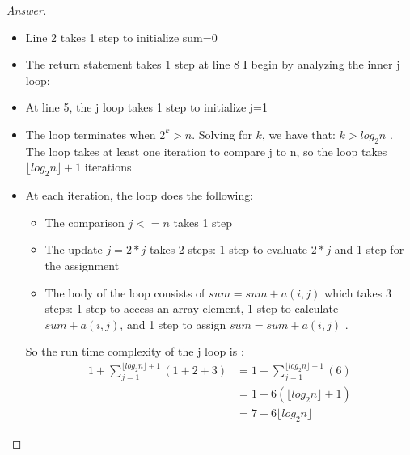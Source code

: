 \documentclass[11pt]{article}
\theoremstyle{definition}
\theoremstyle{definition}
\theoremstyle{definition}
\begin{document}
\begin{proof}[Answer]
\begin{itemize}
\item Line 2 takes 1 step to initialize sum=0
\item The return statement takes 1 step at line 8
I begin by analyzing the inner j loop:
\end{itemize}
\begin{itemize}
\item At line 5, the j loop takes 1 step to initialize j=1
\item The loop terminates when $2^k > n$. Solving for $k$, we have that: $k > log_2 n$ . The loop takes at least one iteration to compare j to n, so the loop takes $\lfloor{ log_2 n }\rfloor +1$ iterations 
\item At each iteration, the loop does the following:
	\begin{itemize}
	\item The comparison $j<=n$ takes 1 step
	\item The update $j=2*j$ takes 2 steps:  1 step to evaluate $2*j$ and 1 step for the assignment 
	\item The body of the loop consists of $sum = sum + a(i, j)$ which takes 3 steps: 1 step to access an array element, 1 step to calculate $sum+ a(i, j)$, and 1 step to assign $sum = sum + a(i, j)$ .
	\end{itemize}
So the run time complexity of the j loop is :
\begin{align*} 
1+ \sum_{j=1}^{\lfloor log_2 n \rfloor +1} (1+2+3)  &= 1+ \sum_{j=1}^{\lfloor log_2 n \rfloor +1} (6) \\
&= 1+ 6(\lfloor log_2 n \rfloor +1) \\
&=7 + 6\lfloor log_2 n \rfloor
\end{align*}
\end{itemize}


\end{proof}
\end{document}
